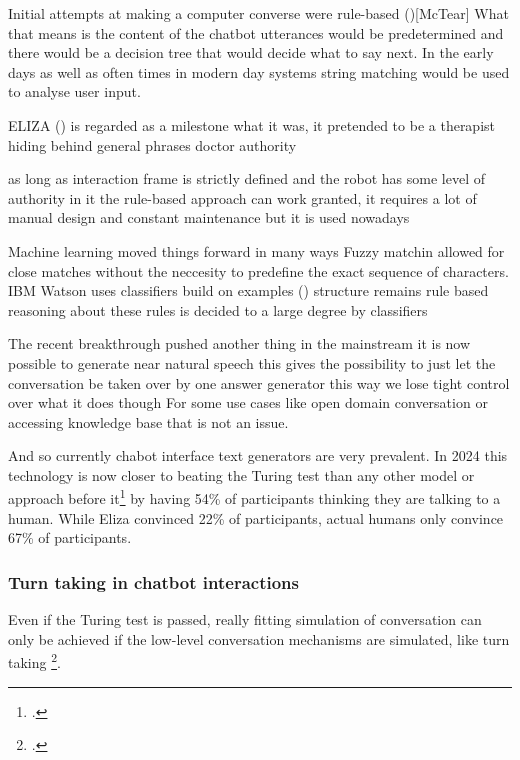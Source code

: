 \documentclass[12pt]{report}
\begin{document}
{\par
Initial attempts at making a computer converse were rule-based ()[McTear]
What that means is the content of the chatbot utterances
would be predetermined
and there would be a decision tree that would decide what to say next.
In the early days as well as often times in modern day systems
string matching would be used to analyse user input.

\par
ELIZA () is regarded as a milestone
what it was, it pretended to be a therapist
hiding behind general phrases
doctor authority

as long as interaction frame is strictly defined and
the robot has some level of authority in it
the rule-based approach can work
granted, it requires a lot of manual design
and constant maintenance
but it is used nowadays

\par
Machine learning moved things forward in many ways
Fuzzy matchin allowed for close matches
without the neccesity to predefine the exact sequence of characters.
IBM Watson uses classifiers build on examples ()
structure remains rule based
reasoning about these rules is decided to a large degree by classifiers

\par
The recent breakthrough pushed another thing in the mainstream
it is now possible to generate near natural speech
this gives the possibility to just let the conversation be taken over by one answer generator
this way we lose tight control over what it does though
For some use cases
like open domain conversation or accessing knowledge base
that is not an issue.

\par
And so currently chabot interface text generators are very prevalent.
In 2024 this technology is now closer to beating the Turing test than
any other model or approach before it\footcite{jones2024peopledistinguishgpt4human}
by having 54\% of participants thinking
they are talking to a human.
While Eliza convinced 22\% of participants,
actual humans only convince 67\% of participants.

\subsubsection{Turn taking in chatbot interactions}

\par
Even if the Turing test is passed,
really fitting simulation of conversation
can only be achieved if the low-level conversation mechanisms
are simulated, like turn taking \footcite{optimizing-turn-taking}.

}
\end{document}
